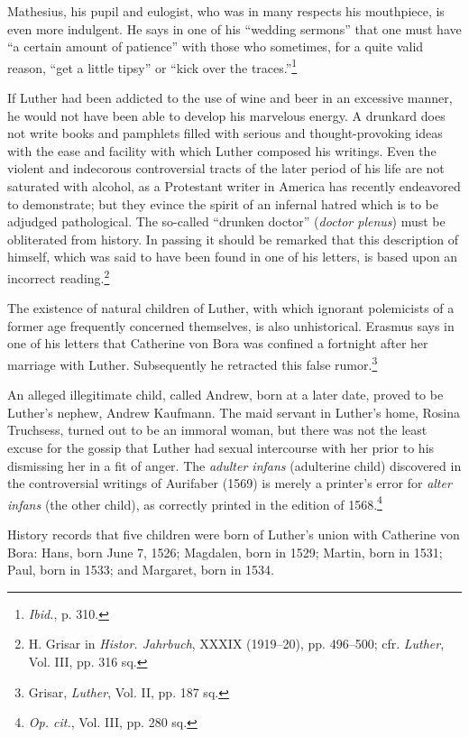 Mathesius, his pupil and eulogist, who was in many respects his
mouthpiece, is even more indulgent. He says in one of his ``wedding
sermons'' that one must have “a certain amount of patience” with
those who sometimes, for a quite valid reason, “get a little tipsy”
or “kick over the traces.”\footnote{\textit{Ibid.}, p. 310.}


If Luther had been addicted to the use of wine and beer in an
excessive manner, he would not have been able to develop his marvelous
energy. A drunkard does not write books and pamphlets filled
with serious and thought-provoking ideas with the ease and facility with
which Luther composed his writings. Even the violent and indecorous
controversial tracts of the later period of his life are not saturated
with alcohol, as a Protestant writer in America has recently endeavored
to demonstrate; but they evince the spirit of an infernal hatred
which is to be adjudged pathological. The so-called “drunken doctor”
(\textit{doctor plenus}) must be obliterated from history. In passing
it should be remarked that this description of himself, which was
said to have been found in one of his letters, is based upon an incorrect
reading.\footnote{H. Grisar in \textit{Histor. Jahrbuch}, XXXIX (1919--20), pp. 496--500; cfr. \textit{Luther}, Vol. III,
pp. 316 sq.}

The existence of natural children of Luther, with which ignorant polemicists of
a former age frequently concerned themselves, is also unhistorical. Erasmus
says in one of his letters that Catherine von Bora was confined a fortnight
after her marriage with Luther. Subsequently he retracted this false
rumor.\footnote{Grisar, \textit{Luther}, Vol. II, pp. 187 sq.}

An alleged illegitimate child, called Andrew, born at a later date, proved to
be Luther’s nephew, Andrew Kaufmann. The maid servant in Luther’s home, Rosina
Truchsess, turned out to be an immoral woman, but there was not the least
excuse for the gossip that Luther had sexual intercourse with her prior to his
dismissing her in a fit of anger. The \textit{adulter infans} (adulterine child)
discovered in the controversial writings of Aurifaber (1569) is merely a
printer’s error for \textit{alter infans} (the other child), as correctly printed in the
edition of 1568.\footnote{\textit{Op. cit.}, Vol. III, pp. 280 sq.}

History records that five children were born of Luther’s union with
Catherine von Bora: Hans, born June 7, 1526; Magdalen, born in
1529; Martin, born in 1531; Paul, born in 1533; and Margaret,
born in 1534.


